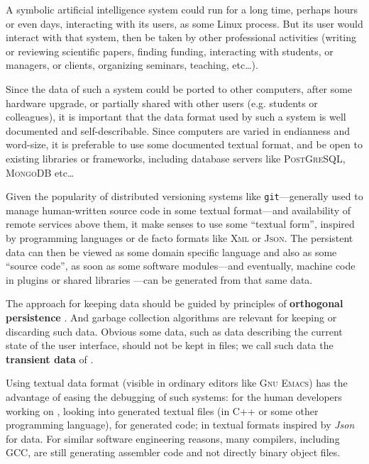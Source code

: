 \documentclass{svproc}
\begin{document}
A symbolic artificial intelligence system could run for a long time,
perhaps hours or even days, interacting with its users, as some Linux
process. But its user would interact with that system, then be taken
by other professional activities (writing or reviewing scientific
papers, finding funding, interacting with students, or managers, or
clients, organizing seminars, teaching, etc\ldots).

Since the data of such a system could be ported to other computers,
after some hardware upgrade, or partially shared with other users
(e.g. students or colleagues), it is important that the data format
used by such a system is well documented and self-describable. Since
computers are varied in endianness and word-size, it is preferable to
use some documented textual format, and be open to existing libraries
or frameworks, including database servers like \textsc{PostGreSQL},
\textsc{MongoDB} etc\ldots\cite{Date:2005:Database-in-Depth}

Given the popularity of distributed versioning systems like
\texttt{git}---generally used to manage human-written source code in
some textual format---and availability of remote services above them,
it make senses to use some ``textual form'', inspired by programming
languages or de facto formats like \textsc{Xml} or \textsc{Json}. The
persistent data can then be viewed as some domain specific language
\cite{Fowler:2010:domain} \cite{Starynkevitch-DSL2011} and also as
some ``source code'', as soon as some software modules---and
eventually, machine code in plugins or shared libraries
\cite{drepper:2011:write-shared-lib}---can be generated from that same
data.

The approach for keeping data should be guided by principles of
\textbf{orthogonal persistence} \cite{dearle:2009:orthogonal}. And
garbage collection algorithms \cite{jones:2016:gchandbook} are
relevant for keeping or discarding such data. Obvious some data, such
as data describing the current state of the user interface, should not
be kept in files; we call such data the \textbf{transient data} of
\RefPerSys.

Using textual data format (visible in ordinary editors like
\textsc{Gnu Emacs}) has the advantage of easing the debugging of such
systems: for the human developers working on \RefPerSys, looking into
generated textual files (in C++ or some other programming language),
for generated code; in textual formats inspired by \textit{Json} for
data. For similar software engineering reasons, many compilers,
including GCC, are still generating assembler code and not directly
binary object files.
\end{document}
